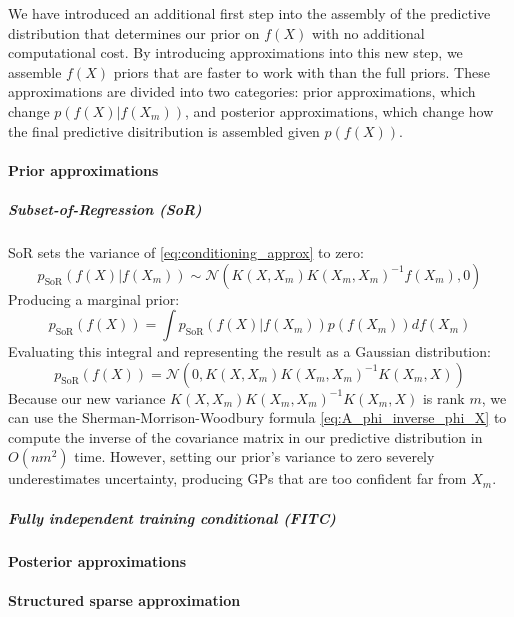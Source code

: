 We have introduced an additional first step into the assembly of the predictive distribution that determines our prior on $f(X)$ with no additional computational cost. By introducing approximations into this new step, we assemble $f(X)$ priors that are faster to work with than the full priors. These approximations are divided into two categories: prior approximations, which change $p(f(X) | f(X_m))$, and posterior approximations, which change how the final predictive disitribution is assembled given $p(f(X))$.

\paragraph{Prior approximations}

\subparagraph{Subset-of-Regression (SoR) \cite{sor}}
SoR sets the variance of \ref{eq:conditioning_approx} to zero:
\begin{equation*}
    p_{\text{SoR}}(f(X) | f(X_m)) \sim \mathcal{N}\left(
    K(X, X_m) K(X_m, X_m)^{-1} f(X_m),
    0
    \right)
\end{equation*}
Producing a marginal prior:
\begin{equation*}
    p_{\text{SoR}}(f(X)) = \int p_{\text{SoR}}(f(X) | f(X_m)) p(f(X_m)) df(X_m)
\end{equation*}
Evaluating this integral and representing the result as a Gaussian distribution:
\begin{equation*}
    p_{\text{SoR}}(f(X)) = \mathcal{N}\left(
    0, 
    K(X, X_m) K(X_m, X_m)^{-1} K(X_m, X)
    \right)
\end{equation*}
Because our new variance $K(X, X_m) K(X_m, X_m)^{-1} K(X_m, X)$ is rank $m$, we can use the Sherman-Morrison-Woodbury formula \ref{eq:A_phi_inverse_phi_X} to compute the inverse of the covariance matrix in our predictive distribution in $O(nm^2)$ time. However, setting our prior's variance to zero severely underestimates uncertainty, producing GPs that are too confident far from $X_m$.

\subparagraph{Fully independent training conditional (FITC)}

\paragraph{Posterior approximations}

\paragraph{Structured sparse approximation}

